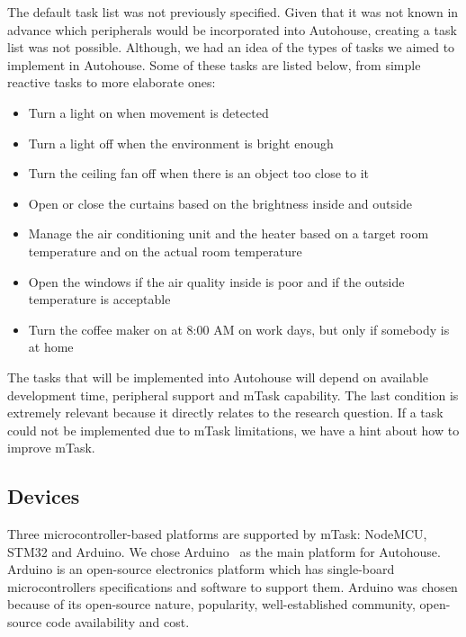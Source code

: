 The default task list was not previously specified. Given that it was not known in advance which peripherals would be incorporated into Autohouse, creating a task list was not possible. Although, we had an idea of the types of tasks we aimed to implement in Autohouse. Some of these tasks are listed below, from simple reactive tasks to more elaborate ones:

\begin{itemize}
    \item Turn a light on when movement is detected
    \item Turn a light off when the environment is bright enough
    \item Turn the ceiling fan off when there is an object too close to it
    \item Open or close the curtains based on the brightness inside and outside
    \item Manage the air conditioning unit and the heater based on a target room temperature and on the actual room temperature
    \item Open the windows if the air quality inside is poor and if the outside temperature is acceptable
    \item Turn the coffee maker on at 8:00 AM on work days, but only if somebody is at home
\end{itemize}

The tasks that will be implemented into Autohouse will depend on available development time, peripheral support and mTask capability. The last condition is extremely relevant because it directly relates to the research question. If a task could not be implemented due to mTask limitations, we have a hint about how to improve mTask.

\subsection{Devices}\label{sec:autohouse_devices}

Three microcontroller-based platforms are supported by mTask: NodeMCU, STM32 and Arduino. We chose Arduino~\cite{arduino} as the main platform for Autohouse. Arduino is an open-source electronics platform which has single-board microcontrollers specifications and software to support them. Arduino was chosen because of its open-source nature, popularity, well-established community, open-source code availability and cost.

